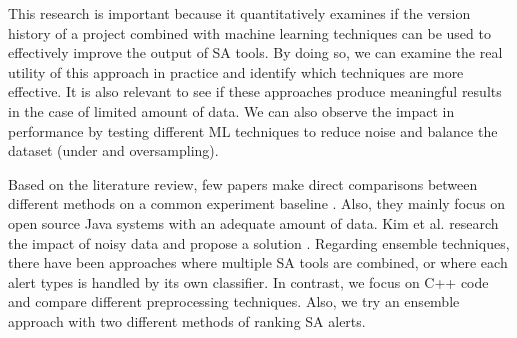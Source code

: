 
This research is important because it quantitatively examines if the version history of a project combined with machine learning techniques can be used to effectively improve the output of SA tools. By doing so, we can examine the real utility of this approach in practice and identify which techniques are more effective. It is also relevant to see if these approaches produce meaningful results in the case of limited amount of data. We can also observe the impact in performance by testing different ML techniques to reduce noise and balance the dataset (under and oversampling). 

Based on the literature review, few papers make direct comparisons between different methods on a common experiment baseline \cite{comparative_heckman, compare_framework}. Also, they mainly focus on open source Java systems with an adequate amount of data. Kim et al. \cite{noise_defect} research the impact of noisy data and propose a solution . Regarding ensemble techniques, there have been approaches where multiple SA tools are combined, or where each alert types is handled by its own classifier. In contrast, we focus on C++ code and compare different preprocessing techniques. Also, we try an ensemble approach with two different methods of ranking SA alerts.
